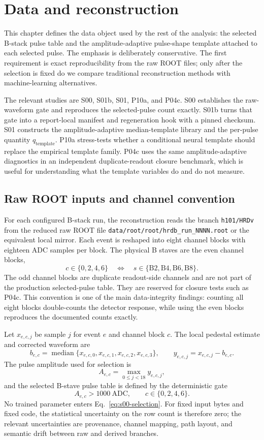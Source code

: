 \chapter{Data and reconstruction}
\label{chap:data-reconstruction}

This chapter defines the data object used by the rest of the analysis: the
selected B-stack pulse table and the amplitude-adaptive pulse-shape template
attached to each selected pulse.  The emphasis is deliberately conservative.
The first requirement is exact reproducibility from the raw ROOT files; only
after the selection is fixed do we compare traditional reconstruction methods
with machine-learning alternatives.

The relevant studies are S00, S01b, S01, P10a, and P04c.  S00 establishes the
raw-waveform gate and reproduces the selected-pulse count exactly.  S01b turns
that gate into a report-local manifest and regeneration hook with a pinned
checksum.  S01 constructs the amplitude-adaptive median-template library and
the per-pulse quantity \(q_{\mathrm{template}}\).  P10a stress-tests whether a
conditional neural template should replace the empirical template family.  P04c
uses the same amplitude-adaptive diagnostics in an independent duplicate-readout
closure benchmark, which is useful for understanding what the template
variables do and do not measure.

\section{Raw ROOT inputs and channel convention}
\label{sec:data-root-inputs}

For each configured B-stack run, the reconstruction reads the branch
\texttt{h101/HRDv} from the reduced raw ROOT file
\texttt{data/root/root/hrdb\_run\_NNNN.root} or the equivalent local mirror.
Each event is reshaped into eight channel blocks with eighteen ADC samples per
block.  The physical B staves are the even channel blocks,
\[
  c \in \{0,2,4,6\}
  \quad\Longleftrightarrow\quad
  s \in \{\mathrm{B2},\mathrm{B4},\mathrm{B6},\mathrm{B8}\}.
\]
The odd channel blocks are duplicate readout-side channels and are not part of
the production selected-pulse table.  They are reserved for closure tests such
as P04c.  This convention is one of the main data-integrity findings: counting
all eight blocks double-counts the detector response, while using the even
blocks reproduces the documented counts exactly.

Let \(x_{e,c,j}\) be sample \(j\) for event \(e\) and channel block \(c\).
The local pedestal estimate and corrected waveform are
\[
  b_{e,c} = \operatorname{median}\{x_{e,c,0},x_{e,c,1},x_{e,c,2},x_{e,c,3}\},
  \qquad
  y_{e,c,j} = x_{e,c,j}-b_{e,c}.
\]
The pulse amplitude used for selection is
\[
  A_{e,c} = \max_{0\leq j<18} y_{e,c,j},
\]
and the selected B-stave pulse table is defined by the deterministic gate
\[
  A_{e,c} > 1000\ \mathrm{ADC},
  \qquad c\in\{0,2,4,6\}.
  \label{eq:s00-selection}
\]
No trained parameter enters Eq.~\ref{eq:s00-selection}.  For fixed input bytes
and fixed code, the statistical uncertainty on the row count is therefore zero;
the relevant uncertainties are provenance, channel mapping, path layout, and
semantic drift between raw and derived branches.


